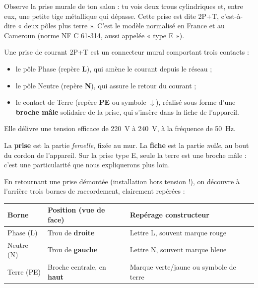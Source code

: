 \documentclass[11pt]{article}
\newcommand{\cle}[1]{{\popxbold\color{popdark}#1}}
\begin{document}
Observe la prise murale de ton salon : tu vois deux trous cylindriques et, entre eux, une petite tige métallique qui dépasse. Cette prise est dite \cle{2P+T}, c'est-à-dire « deux pôles plus terre ». C'est le modèle normalisé en France et au Cameroun (norme NF C 61-314, aussi appelée « type E »).

\begin{definition}
Une \cle{prise de courant 2P+T} est un connecteur mural comportant trois contacts :
\begin{itemize}
\item le pôle \cle{Phase} (repère \textbf{L}), qui amène le courant depuis le réseau ;
\item le pôle \cle{Neutre} (repère \textbf{N}), qui assure le retour du courant ;
\item le contact de \cle{Terre} (repère \textbf{PE} ou symbole $\downarrow$), réalisé sous forme d'une \textbf{broche mâle} solidaire de la prise, qui s'insère dans la fiche de l'appareil.
\end{itemize}
Elle délivre une tension efficace de \SI{220}{V} à \SI{240}{V}, à la fréquence de \SI{50}{Hz}.
\end{definition}

\begin{attention}
La \textbf{prise} est la partie \emph{femelle}, fixée au mur. La \textbf{fiche} est la partie \emph{mâle}, au bout du cordon de l'appareil. Sur la prise type E, seule la terre est une broche mâle : c'est une particularité que nous expliquerons plus loin.
\end{attention}

En retournant une prise démontée (installation hors tension !), on découvre à l'arrière trois bornes de raccordement, clairement repérées :

\begin{center}
\begin{tabularx}{\linewidth}{|l|X|X|}\hline
\rowcolor{popblueL} \textbf{Borne} & \textbf{Position (vue de face)} & \textbf{Repérage constructeur} \\ \hline
Phase (L) & Trou de \textbf{droite} & Lettre L, souvent marque rouge \\ \hline
Neutre (N) & Trou de \textbf{gauche} & Lettre N, souvent marque bleue \\ \hline
Terre (PE) & Broche centrale, en \textbf{haut} & Marque verte/jaune ou symbole de terre \\ \hline
\end{tabularx}
\end{center}
\end{document}
